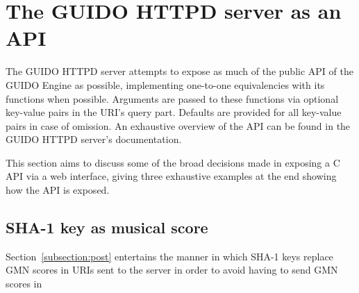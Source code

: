 \documentclass[11pt,a4paper]{article}
\begin{document}

\section{The GUIDO HTTPD server as an API}\label{section:guido-api}
The GUIDO HTTPD server attempts to expose as much of the public API of the GUIDO Engine as possible, implementing one-to-one equivalencies with its functions when possible.  Arguments are passed to these functions via optional key-value pairs in the URI's query part.  Defaults are provided for all key-value pairs in case of omission.  An exhaustive overview of the API can be found in the GUIDO HTTPD server's documentation\cite{guidoserverdoc}.\par
This section aims to discuss some of the broad decisions made in exposing a C API via a web interface, giving three exhaustive examples at the end showing how the API is exposed.
\subsection{SHA-1 key as musical score}
Section~\ref{subsection:post} entertains the manner in which SHA-1 keys replace GMN scores in URIs sent to the server in order to avoid having to send GMN scores in 
\end{document}
